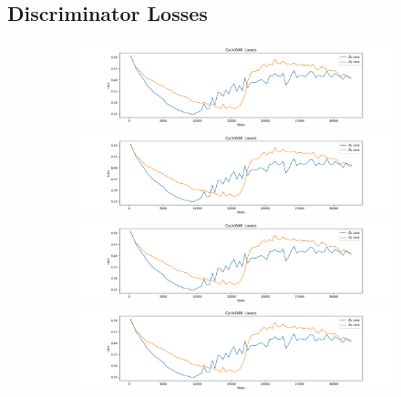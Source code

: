 \documentclass[12pt, fleqn, titlepage]{article}
\begin{document}
\subsection{Discriminator Losses}\label{disc_loss}
\begin{figure}[H]
	\centering
	\begin{subfigure}[b]{0.8\textwidth}
		\centering
		\includegraphics[width=\linewidth]{imgs/placeholder_discriminator_losses}
		\hfill
		\includegraphics[width=\linewidth]{imgs/placeholder_discriminator_losses}
		\hfill
		\includegraphics[width=\linewidth]{imgs/placeholder_discriminator_losses}
		\hfill
		\includegraphics[width=\linewidth]{imgs/placeholder_discriminator_losses}
	\end{subfigure}
\end{figure}
\end{document}
